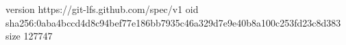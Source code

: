 version https://git-lfs.github.com/spec/v1
oid sha256:0aba4bccd4d8c94bef77e186bb7935c46a329d7e9e40b8a100c253fd23c8d383
size 127747
